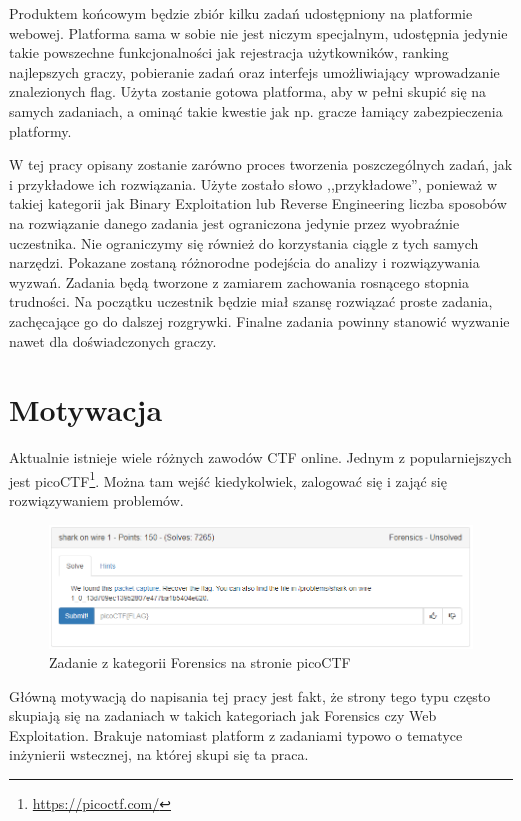 \documentclass[language=polish,type=eng]{aghmodern}
\begin{document}
Produktem końcowym będzie zbiór kilku zadań udostępniony na platformie webowej.
Platforma sama w sobie nie jest niczym specjalnym, udostępnia jedynie takie powszechne
funkcjonalności jak rejestracja użytkowników, ranking najlepszych graczy,
pobieranie zadań oraz interfejs umożliwiający wprowadzanie znalezionych
flag. Użyta zostanie gotowa platforma, aby w pełni skupić się na samych zadaniach,
a ominąć takie kwestie jak np. gracze łamiący zabezpieczenia platformy.

W tej pracy opisany zostanie zarówno proces tworzenia poszczególnych zadań,
jak i przykładowe ich rozwiązania. Użyte zostało słowo ,,przykładowe'', ponieważ
w takiej kategorii jak Binary Exploitation lub Reverse Engineering liczba sposobów
na rozwiązanie danego zadania jest ograniczona jedynie przez wyobraźnie uczestnika.
Nie ograniczymy się również do korzystania ciągle z tych samych narzędzi.
Pokazane zostaną różnorodne podejścia do analizy i rozwiązywania wyzwań.
Zadania będą tworzone z zamiarem zachowania rosnącego stopnia trudności.
Na początku uczestnik będzie miał szansę rozwiązać proste zadania,
zachęcające go do dalszej rozgrywki. Finalne zadania powinny stanowić wyzwanie
nawet dla doświadczonych graczy.

\section{Motywacja}

Aktualnie istnieje wiele różnych zawodów CTF online. Jednym z popularniejszych
jest \mbox{picoCTF}\footnote{\url{https://picoctf.com/}}.
Można tam wejść kiedykolwiek, zalogować się i zająć się rozwiązywaniem problemów.

\begin{figure}[H]
\centering
\includegraphics[width=\textwidth]{picoctf}
\caption{Zadanie z kategorii Forensics na stronie picoCTF}
\end{figure}

Główną motywacją do napisania tej pracy jest fakt, że strony tego typu często skupiają
się na zadaniach w takich kategoriach jak Forensics czy Web Exploitation.
Brakuje natomiast platform z zadaniami typowo o tematyce inżynierii
wstecznej, na której skupi się ta praca.
\end{document}
